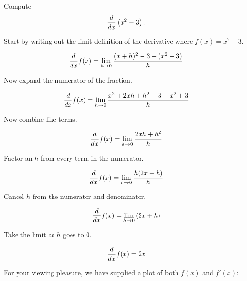 \documentclass[handout]{ximera}
\begin{document}
\begin{example}
Compute 
\[
\frac{d}{dx} \left(x^2 - 3\right).
\]
\begin{explantion}
Start by writing out the limit definition of the derivative where
$f(x) = x^2-3$.
\begin{freeResponse}[given]
\[
\frac{d}{dx} f(x) = \lim_{h\to 0}\frac{(x+h)^2 - 3 - (x^2 - 3)}{h}
\]
\end{freeResponse}
Now expand the numerator of the fraction.
\begin{freeResponse}[given]
\[
\frac{d}{dx} f(x) = \lim_{h\to 0}\frac{x^2 + 2xh + h^2 -3 - x^2 +3}{h}
\]
\end{freeResponse}
Now combine like-terms.
\begin{freeResponse}[given]
\[
\frac{d}{dx} f(x) = \lim_{h\to 0}\frac{2xh + h^2}{h}
\]
\end{freeResponse}
Factor an $h$ from every term in the numerator.
\begin{freeResponse}[given]
\[
\frac{d}{dx} f(x) = \lim_{h\to 0}\frac{h(2x + h)}{h}
\]
\end{freeResponse}
Cancel $h$ from the numerator and denominator.
\begin{freeResponse}[given]
\[
\frac{d}{dx} f(x) = \lim_{h\to 0} \left(2x + h\right)
\]
\end{freeResponse}
Take the limit as $h$ goes to $0$. 
\begin{freeResponse}[given]
\[
\frac{d}{dx} f(x) = 2x
\]
\end{freeResponse}
For your viewing pleasure, we have supplied a plot of both $f(x)$ and
$f'(x)$:
\begin{image}
\end{image}
\end{explantion}
\end{example}
\end{document}
